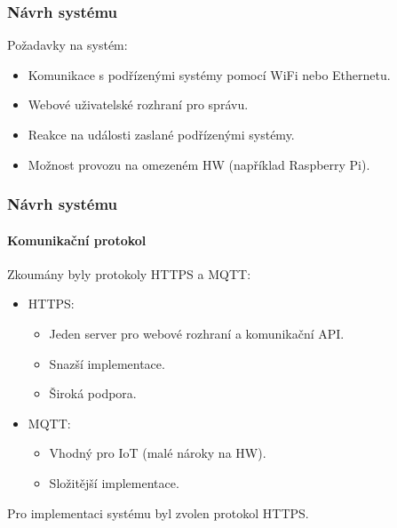 \documentclass{beamer}
\begin{document}
  \begin{frame}
    \frametitle{Návrh systému}



      Požadavky na systém:

      \begin{itemize}
        \item Komunikace s podřízenými systémy pomocí WiFi nebo Ethernetu.
        \item Webové uživatelské rozhraní pro správu.
        \item Reakce na události zaslané podřízenými systémy.
        \item Možnost provozu na omezeném HW (například Raspberry Pi). %
      \end{itemize}
  \end{frame}

  \begin{frame}
    \frametitle{Návrh systému}
    \framesubtitle{Komunikační protokol}

    Zkoumány byly protokoly HTTPS a MQTT:

    \begin{itemize}
      \item HTTPS: 
      \begin{itemize}
        \item Jeden server pro webové rozhraní a komunikační API.
        \item Snazší implementace.
        \item Široká podpora.
      \end{itemize}
      \item MQTT:
      \begin{itemize}
        \item Vhodný pro IoT (malé nároky na HW).
        \item Složitější implementace.
      \end{itemize}
    \end{itemize}

    Pro implementaci systému byl zvolen protokol HTTPS.


  \end{frame}
\end{document}
